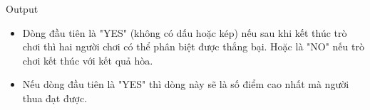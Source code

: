 Output  
\begin{itemize}
	\item     Dòng đầu tiên là "YES" (không có dấu hoặc kép) nếu sau khi kết thúc trò chơi thì hai người chơi có thể phân biệt được thắng bại. Hoặc là "NO" nếu trò chơi kết thúc với kết quả hòa.   
	\item     Nếu dòng đầu tiên là "YES" thì dòng này sẽ là số điểm cao nhất mà người         thua        đạt được.   
\end{itemize}